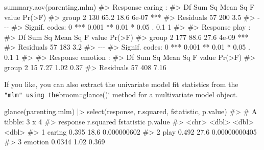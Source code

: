 \documentclass[
  letterpaper,
  10pt,
  krantz2]{krantz}
\makeatletter
\newenvironment{Shaded}{\begin{snugshade}}{\end{snugshade}}
\newcommand{\CommentTok}[1]{\textcolor[rgb]{0.37,0.37,0.37}{#1}}
\newcommand{\FunctionTok}[1]{\textcolor[rgb]{0.28,0.35,0.67}{#1}}
\newcommand{\NormalTok}[1]{\textcolor[rgb]{0.00,0.23,0.31}{#1}}
\newcommand{\SpecialCharTok}[1]{\textcolor[rgb]{0.37,0.37,0.37}{#1}}
\newenvironment{kframe}{%
  \medskip{}
  \setlength{\fboxsep}{.8em}
  \def\at@end@of@kframe{}%
  \ifinner\ifhmode%
  \def\at@end@of@kframe{\end{minipage}}%
  \begin{minipage}{\columnwidth}%
  \fi\fi%
  \def\FrameCommand##1{\hskip\@totalleftmargin \hskip-\fboxsep
  \colorbox{shadecolor}{##1}\hskip-\fboxsep
      \hskip-\linewidth \hskip-\@totalleftmargin \hskip\columnwidth}%
  \MakeFramed {\advance\hsize-\width
    \@totalleftmargin\z@ \linewidth\hsize
    \@setminipage}}%
{\par\unskip\endMakeFramed%
  \at@end@of@kframe}
\renewenvironment{Shaded}{\begin{kframe}}{\end{kframe}}
\makeatother
\begin{document}
\begin{Shaded}
\begin{Highlighting}[]
\FunctionTok{summary.aov}\NormalTok{(parenting.mlm)}
\CommentTok{\#\textgreater{}  Response caring :}
\CommentTok{\#\textgreater{}             Df Sum Sq Mean Sq F value Pr(\textgreater{}F)    }
\CommentTok{\#\textgreater{} group        2    130    65.2    18.6  6e{-}07 ***}
\CommentTok{\#\textgreater{} Residuals   57    200     3.5                   }
\CommentTok{\#\textgreater{} {-}{-}{-}}
\CommentTok{\#\textgreater{} Signif. codes:  0 \textquotesingle{}***\textquotesingle{} 0.001 \textquotesingle{}**\textquotesingle{} 0.01 \textquotesingle{}*\textquotesingle{} 0.05 \textquotesingle{}.\textquotesingle{} 0.1 \textquotesingle{} \textquotesingle{} 1}
\CommentTok{\#\textgreater{} }
\CommentTok{\#\textgreater{}  Response play :}
\CommentTok{\#\textgreater{}             Df Sum Sq Mean Sq F value Pr(\textgreater{}F)    }
\CommentTok{\#\textgreater{} group        2    177    88.6    27.6  4e{-}09 ***}
\CommentTok{\#\textgreater{} Residuals   57    183     3.2                   }
\CommentTok{\#\textgreater{} {-}{-}{-}}
\CommentTok{\#\textgreater{} Signif. codes:  0 \textquotesingle{}***\textquotesingle{} 0.001 \textquotesingle{}**\textquotesingle{} 0.01 \textquotesingle{}*\textquotesingle{} 0.05 \textquotesingle{}.\textquotesingle{} 0.1 \textquotesingle{} \textquotesingle{} 1}
\CommentTok{\#\textgreater{} }
\CommentTok{\#\textgreater{}  Response emotion :}
\CommentTok{\#\textgreater{}             Df Sum Sq Mean Sq F value Pr(\textgreater{}F)}
\CommentTok{\#\textgreater{} group        2     15    7.27    1.02   0.37}
\CommentTok{\#\textgreater{} Residuals   57    408    7.16}
\end{Highlighting}
\end{Shaded}

If you like, you can also extract the univariate model fit statistics
from the \texttt{"mlm"\ using\ the}broom::glance()` method for a
multivariate model object.

\begin{Shaded}
\begin{Highlighting}[]
\FunctionTok{glance}\NormalTok{(parenting.mlm) }\SpecialCharTok{|\textgreater{}}
  \FunctionTok{select}\NormalTok{(response, r.squared, fstatistic, p.value)}
\CommentTok{\#\textgreater{} \# A tibble: 3 x 4}
\CommentTok{\#\textgreater{}   response r.squared fstatistic       p.value}
\CommentTok{\#\textgreater{}   \textless{}chr\textgreater{}        \textless{}dbl\textgreater{}      \textless{}dbl\textgreater{}         \textless{}dbl\textgreater{}}
\CommentTok{\#\textgreater{} 1 caring      0.395       18.6  0.000000602  }
\CommentTok{\#\textgreater{} 2 play        0.492       27.6  0.00000000405}
\CommentTok{\#\textgreater{} 3 emotion     0.0344       1.02 0.369}
\end{Highlighting}
\end{Shaded}
\end{document}
